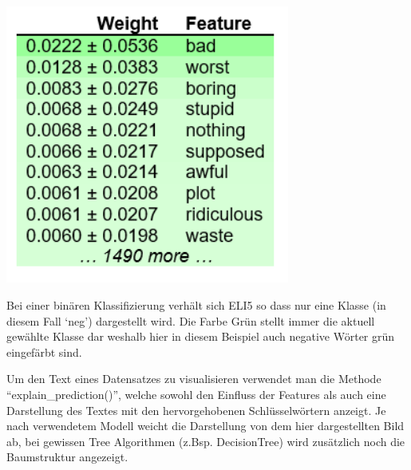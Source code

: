 \documentclass[
  12pt, %
  a4paper, %
  oneside, %
  openany, 
  numbers=noenddot, %
  BCOR=5mm, %
  parskip=half*, %
  thesis, %
]{bfhbook}
\begin{document}
\begin{center}
\begin{minipage}[t]{0.45\linewidth}
\vspace{0pt}
\centering
	\includegraphics[width=0.7\textwidth]{Bilder/MovieReviews-SentimentClassification_Weights.PNG}
\end{minipage}\hfill
\begin{minipage}[t]{0.45\linewidth}
\vspace{20pt}
Bei einer binären Klassifizierung verhält sich ELI5  so dass nur eine Klasse (in diesem Fall `neg') dargestellt wird. Die Farbe Grün stellt immer die aktuell gewählte Klasse dar weshalb hier in diesem Beispiel auch negative Wörter grün eingefärbt sind.
\end{minipage}
\end{center}

Um den Text eines Datensatzes zu visualisieren verwendet man die Methode ``explain\_prediction()'', welche sowohl den Einfluss der Features als auch eine Darstellung des Textes mit den hervorgehobenen Schlüsselwörtern anzeigt. Je nach verwendetem Modell weicht die Darstellung von dem hier dargestellten Bild ab, bei gewissen Tree Algorithmen (z.Bsp. DecisionTree) wird zusätzlich noch die Baumstruktur angezeigt.
\end{document}
